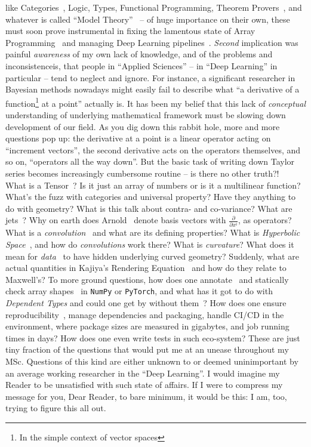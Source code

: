 like Categories~\citep{categoriesWorking}, Logic, Types, Functional
Programming, Theorem Provers~\citep{coq,lean}, and whatever is called ``Model
Theory''~\citep{marker2006model} -- of huge importance on their own, these must
soon prove instrumental in fixing the lamentous state of Array
Programming~\citep{dexlang,mcdonellGPU} and managing Deep Learning
pipelines~\citep{mokhov2018build}.  \emph{Second} implication was painful
\emph{awareness} of my own lack of knowledge, and of the problems and
inconsistenceis, that people in ``Applied Sciences'' -- in ``Deep Learning'' in
particular -- tend to neglect and ignore.  For instance, a significant
researcher in Bayesian methods nowadays might easily fail to describe what ``a
derivative of a function\footnote{In the simple context of vector spaces} at a
point'' actually is. It has been my belief that this lack of \emph{conceptual}
understanding of underlying mathematical framework must be slowing down
development of our field. As you dig down this rabbit hole, more and more
questions pop up: the derivative at a point is a linear operator acting on
``increment vectors'', the second derivative acts on the operators themselves,
and so on, ``operators all the way down''. But the basic task of writing down
Taylor series becomes increasingly cumbersome routine -- is there no other
truth?!~\citep{elliott2018simple} What is a
Tensor~\citep{bradley2020interface}? Is it just an array of numbers or is it a
multilinear function? What's the fuzz with categories and universal property?
Have they anything to do with geometry?  What is this talk about contra- and
co-variance?  What are jets~\citep{betancourt2018geometric}?  Why on earth does
Arnold~\citep{arnoldPDEs} denote basis vectors with \( \frac{\partial}{\partial
x^i} \), as operators?  What is a
\emph{convolution}~\citep{feichtingerFAHA,cohen2018general,e2cnn} and what are
its defining properties? What is \emph{Hyperbolic Space}~\citep{ganeaHNNs}, and
how do \emph{convolutions} work there? What is \emph{curvature}? What does it
mean for \emph{data}~\citep{khrulkov} to have hidden underlying curved
geometry? Suddenly, what are actual quantities in Kajiya's Rendering
Equation~\citep{kajiya1986rendering} and how do they relate to Maxwell's? To
more ground questions, how does one
annotate~\citep{documentationResearch,struturingDocumentation,doctest,doctestRust,doctestCpp}
and statically check array shapes~\citep{rush2019tensor,rush2019tensor2} in
\texttt{NumPy} or \texttt{PyTorch}, and what has it got to do with
\emph{Dependent Types} and could one get by without them~\citep{dexlang,slap}?
How does one ensure
reproducibility~\citep{inriaSacred,catalyst,pytorchLightning,xinLiangPipelines,},
manage dependencies and packaging, handle CI/CD in the environment, where
package sizes are measured in gigabytes, and job running times in days?  How
does one even write tests in such eco-system?  These are just tiny fraction of
the questions that would put me at an unease throughout my MSc. Questions of
this kind are either unknown to or deemed uninimportant by an average working
researcher in the ``Deep Learning''. I would imagine my Reader to be
unsatisfied with such state of affairs. If I were to compress my message for
you, Dear Reader, to bare minimum, it would be this: I am, too, trying to
figure this all out.

